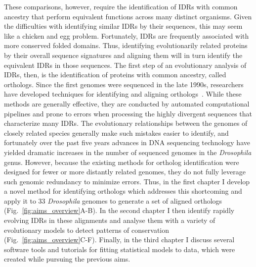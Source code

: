 These comparisons, however, require the identification of IDRs with common ancestry that perform equivalent functions across many distinct organisms. Given the difficulties with identifying similar IDRs by their sequences, this may seem like a chicken and egg problem. Fortunately, IDRs are frequently associated with more conserved folded domains. Thus, identifying evolutionarily related proteins by their overall sequence signatures and aligning them will in turn identify the equivalent IDRs in those sequences. The first step of an evolutionary analysis of IDRs, then, is the identification of proteins with common ancestry, called orthologs. Since the first genomes were sequenced in the late 1990s, researchers have developed techniques for identifying and aligning orthologs~\cite{Fleischmann1995, Goffeau1996, CESC1998, Tatusov1997}. While these methods are generally effective, they are conducted by automated computational pipelines and prone to errors when processing the highly divergent sequences that characterize many IDRs. The evolutionary relationships between the genomes of closely related species generally make such mistakes easier to identify, and fortunately over the past five years advances in DNA sequencing technology have yielded dramatic increases in the number of sequenced genomes in the \textit{Drosophila} genus. However, because the existing methods for ortholog identification were designed for fewer or more distantly related genomes, they do not fully leverage such genomic redundancy to minimize errors. Thus, in the first chapter I develop a novel method for identifying orthologs which addresses this shortcoming and apply it to 33 \textit{Drosophila} genomes to generate a set of aligned orthologs (Fig.~\ref{fig:aims_overview}A-B). In the second chapter I then identify rapidly evolving IDRs in these alignments and analyse them with a variety of evolutionary models to detect patterns of conservation (Fig.~\ref{fig:aims_overview}C-F). Finally, in the third chapter I discuss several software tools and tutorials for fitting statistical models to data, which were created while pursuing the previous aims.
